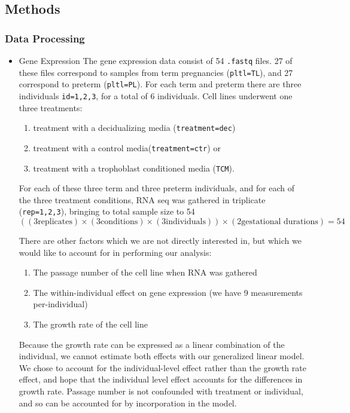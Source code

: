 \subsection{Methods}\label{sec:org53944c4}


\subsubsection{Data Processing}\label{sec:orgc908098}

\begin{itemize}
\item Gene Expression\label{sec:orgbe0b3e5}
The gene expression data consist of 54 \texttt{.fastq} files.  27 of these files correspond to samples from term pregnancies (\texttt{pltl=TL}), and 27 correspond to preterm (\texttt{pltl=PL}).  For each term and preterm there are three 
individuals \texttt{id=1,2,3}, for a total of 6 individuals.  Cell lines underwent one three treatments:

\begin{enumerate}
\item treatment with a decidualizing media (\texttt{treatment=dec})
\item treatment with a control media(\texttt{treatment=ctr}) or
\item treatment with a trophoblast conditioned media (\texttt{TCM}).
\end{enumerate}

For each of these three term and three preterm individuals, and for each of the three treatment conditions, RNA seq was gathered in triplicate (\texttt{rep=1,2,3}), bringing to total sample size to 54 
$$ \left((3 \text{replicates}) \times (3 \text{conditions})  \times (3 \text{individuals})\right) \times (2 \text{gestational durations})=54$$



There are other factors which we are not directly interested in, but which we would like to account for in performing our analysis:

\begin{enumerate}
\item The passage number of the cell line when RNA was gathered
\item The within-individual effect on gene expression (we have 9 measurements per-individual)
\item The growth rate of the cell line
\end{enumerate}

Because the growth rate can be expressed as a linear combination of the individual, we cannot estimate both effects with our generalized linear model.  We chose to account for the individual-level effect rather
than the growth rate effect, and hope that the individual level effect accounts for the differences in growth rate. Passage number is not confounded with treatment or individual, and so can be accounted for by incorporation
in the model.



\end{itemize}
